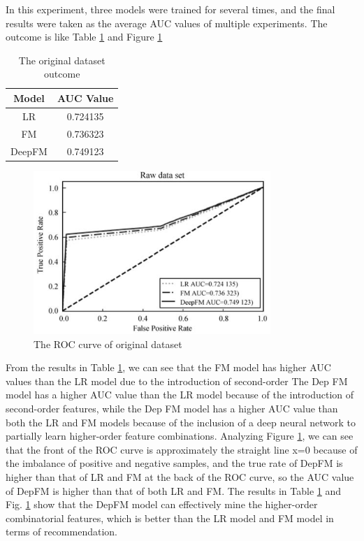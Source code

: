 \documentclass[11pt,en]{elegantpaper}
\begin{document}
In this experiment, three models were trained for several times, and the final results were taken as the average AUC values of multiple experiments. The outcome is like Table \ref{roc1tb} and Figure \ref{roc1fg}
\begin{table}[h]
	\centering
	\caption{The original dataset outcome}
	\label{roc1tb}
	\begin{tabular}{|c|c|}
		\hline Model & AUC Value \\
		\hline LR & 0.724135 \\
		\hline FM & 0.736323 \\
		\hline DeepFM & 0.749123 \\
		\hline
	\end{tabular}
\end{table}

\begin{figure}[h]
	\centering
	\includegraphics[width=0.8\textwidth]{./image/roc1.png}
	\caption{The ROC curve of original dataset}
	\label{roc1fg}
\end{figure}

From the results in Table \ref{roc1tb}, we can see that the FM model has higher AUC values than the LR model due to the introduction of second-order The Dep FM model has a higher AUC value than the LR model because of the introduction of second-order features, while the Dep FM model has a higher AUC value than both the LR and FM models because of the inclusion of a deep neural network to partially learn higher-order feature combinations. Analyzing Figure \ref{roc1fg}, we can see that the front of the ROC curve is approximately the straight line x=0 because of the imbalance of positive and negative samples, and the true rate of DepFM is higher than that of LR and FM at the back of the ROC curve, so the AUC value of DepFM is higher than that of both LR and FM. The results in Table \ref{roc1tb} and Fig. \ref{roc1fg} show that the DepFM model can effectively mine the higher-order combinatorial features, which is better than the LR model and FM model in terms of recommendation.
\end{document}
